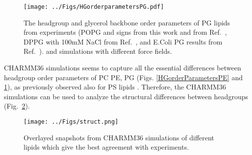 \documentclass[aps,prl,superscriptaddress,twocolumn]{revtex4}
\begin{document}
\begin{figure}[!h]
  \centering
  \texttt{[image: ../Figs/HGorderparametersPG.pdf]}
  \caption{\label{HGorderParametersPOPG}
    The headgroup and glycerol backbone order parameters of PG lipids
    from experiments (POPG and signs from this work and from Ref.~, %
    DPPG with 100mM NaCl from Ref.~,%
    and E.Coli PG results from Ref.~).
    and simulations with different force fields.
  }
\end{figure}


CHARMM36 simulations seems to capture all the essential differences between
headgroup order parameters of PC PE, PG (Figs. \ref{HGorderParametersPE} and \ref{HGorderParametersPOPG}),
as previously observed also for PS lipids \cite{NMRlipidsIVps}. Therefore,
the CHARMM36 simulations can be used to analyze the structural differences between
headgroups (Fig.~\ref{structures}).
\begin{figure}[!h]
  \centering
  \texttt{[image: ../Figs/struct.png]}
  \caption{\label{structures}
    Overlayed snapshots from CHARMM36 simulations of different lipids which give the best agreement with experiments.
  }
\end{figure}
\end{document}
